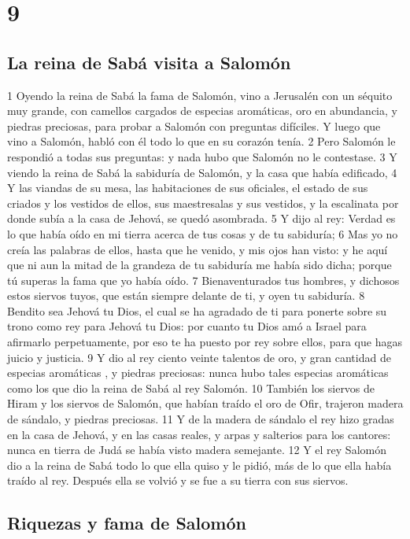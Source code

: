 \chapter{9}

\section*{La reina de Sabá visita a Salomón }

1 Oyendo la reina de Sabá la fama de Salomón, vino a Jerusalén  con un séquito muy grande, con camellos cargados de especias aromáticas, oro en abundancia, y piedras preciosas, para probar a Salomón con preguntas difíciles. Y luego que vino a Salomón, habló con él todo lo que en su corazón tenía.
2 Pero Salomón le respondió a todas sus preguntas: y nada hubo que Salomón no le contestase.
3 Y viendo la reina de Sabá la sabiduría de Salomón, y la casa que había edificado,
4 Y las viandas de su mesa, las habitaciones de sus oficiales, el estado de sus criados y los vestidos de ellos, sus maestresalas y sus vestidos, y la escalinata por donde subía a la casa de Jehová, se quedó asombrada.
5 Y dijo al rey: Verdad es lo que había oído en mi tierra acerca de tus cosas y de tu sabiduría;
6 Mas yo no creía las palabras de ellos, hasta que he venido, y mis ojos han visto: y he aquí que ni aun la mitad de la grandeza de tu sabiduría me había sido dicha; porque tú superas la fama que yo había oído.
7 Bienaventurados tus hombres, y dichosos estos siervos tuyos, que están siempre delante de ti, y oyen tu sabiduría.
8 Bendito sea Jehová tu Dios, el cual se ha agradado de ti para ponerte sobre su trono como rey para Jehová tu Dios: por cuanto tu Dios amó a Israel para afirmarlo perpetuamente, por eso te ha puesto por rey sobre ellos, para que hagas juicio y justicia.
9 Y dio al rey ciento veinte talentos de oro,  y gran cantidad de especias aromáticas , y piedras preciosas: nunca hubo tales especias aromáticas  como los que dio la reina de Sabá al rey Salomón. 
10 También los siervos de Hiram y los siervos de Salomón, que habían traído el oro de Ofir, trajeron madera de sándalo, y piedras preciosas.
11 Y  de la madera de sándalo el rey hizo gradas en la casa de Jehová, y en las casas reales, y arpas y salterios para los cantores: nunca en tierra de Judá se había visto madera semejante.
12 Y el rey Salomón dio a la reina de Sabá todo lo que ella quiso y le pidió, más de lo que ella había traído al rey. Después ella se volvió y se fue a su tierra con sus siervos.

\section*{Riquezas y fama de Salomón}

